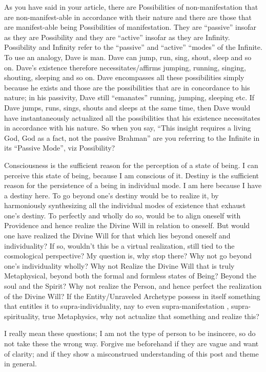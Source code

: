 \begin{footnotesize}
\begin{sffamily}
As you have said in your article, there are Possibilities of non-manifestation that are non-manifest-able in accordance with their nature and there are those that are manifest-able being Possibilities of manifestation. They are “passive” insofar as they are Possibility and they are “active” insofar as they are Infinity. Possibility and Infinity refer to the “passive” and “active” “modes” of the Infinite. To use an analogy, Dave is man. Dave can jump, run, sing, shout, sleep and so on. Dave's existence therefore necessitates/affirms jumping, running, singing, shouting, sleeping and so on. Dave encompasses all these possibilities simply because he exists and those are the possibilities that are in concordance to his nature; in his passivity, Dave still “emanates” running, jumping, sleeping etc. If Dave jumps, runs, sings, shouts and sleeps at the same time, then Dave would have instantaneously actualized all the possibilities that his existence necessitates in accordance with his nature. So when you say, “This insight requires a living God, God as a fact, not the passive Brahman” are you referring to the Infinite in its “Passive Mode”, viz Possibility?

Consciousness is the sufficient reason for the perception of a state of being. I can perceive this state of being, because I am conscious of it. Destiny is the sufficient reason for the persistence of a being in individual mode. I am here because I have a destiny here. To go beyond one's destiny would be to realize it, by harmoniously synthesizing all the individual modes of existence that exhaust one's destiny. To perfectly and wholly do so, would be to align oneself with Providence and hence realize the Divine Will in relation to oneself. But would one have realized the Divine Will for that which lies beyond oneself and individuality? If so, wouldn't this be a virtual realization, still tied to the cosmological perspective? My question is, why stop there? Why not go beyond one's individuality wholly? Why not Realize the Divine Will that is truly Metaphysical, beyond both the formal and formless states of Being? Beyond the soul and the Spirit? Why not realize the Person, and hence perfect the realization of the Divine Will? If the Entity/Unraveled Archetype possess in itself something that entitles it to supra-individuality, nay to even supra-manifestation , supra-spirituality, true Metaphysics, why not actualize that something and realize this?

I really mean these questions; I am not the type of person to be insincere, so do not take these the wrong way. Forgive me beforehand if they are vague and want of clarity; and if they show a misconstrued understanding of this post and theme in general.



\end{sffamily}
\end{footnotesize}
